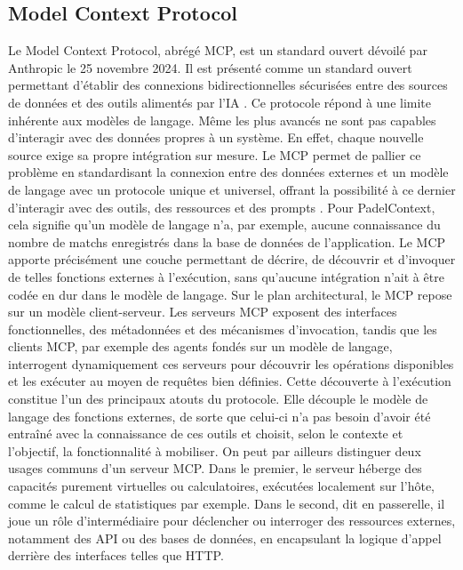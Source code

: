 \documentclass[12pt]{article}
\begin{document}
\subsection{Model Context Protocol}
Le Model Context Protocol, abrégé MCP, est un standard ouvert dévoilé par Anthropic le 25 novembre 2024. Il est présenté comme un standard ouvert permettant d'établir des connexions bidirectionnelles sécurisées entre des sources de données et des outils alimentés par l'IA \parencite{anthropic_introducing_2024}. 
\newline\newline
Ce protocole répond à une limite inhérente aux modèles de langage. Même les plus avancés ne sont pas capables d'interagir avec des données propres à un système. En effet, chaque nouvelle source exige sa propre intégration sur mesure. Le MCP permet de pallier ce problème en standardisant la connexion entre des données externes et un modèle de langage avec un protocole unique et universel, offrant la possibilité à ce dernier d'interagir avec des outils, des ressources et des prompts \parencite{vieira_da_silva_beyond_2025}.
\newline\newline
Pour PadelContext, cela signifie qu'un modèle de langage n'a, par exemple, aucune connaissance du nombre de matchs enregistrés dans la base de données de l'application. Le MCP apporte précisément une couche permettant de décrire, de découvrir et d'invoquer de telles fonctions externes à l'exécution, sans qu'aucune intégration n'ait à être codée en dur dans le modèle de langage.
\newline\newline
Sur le plan architectural, le MCP repose sur un modèle client-serveur. Les serveurs MCP exposent des interfaces fonctionnelles, des métadonnées et des mécanismes d'invocation, tandis que les clients MCP, par exemple des agents fondés sur un modèle de langage, interrogent dynamiquement ces serveurs pour découvrir les opérations disponibles et les exécuter au moyen de requêtes bien définies. Cette découverte à l'exécution constitue l'un des principaux atouts du protocole. Elle découple le modèle de langage des fonctions externes, de sorte que celui-ci n'a pas besoin d'avoir été entraîné avec la connaissance de ces outils et choisit, selon le contexte et l'objectif, la fonctionnalité à mobiliser.
\newline\newline
On peut par ailleurs distinguer deux usages communs d'un serveur MCP. Dans le premier, le serveur héberge des capacités purement virtuelles ou calculatoires, exécutées localement sur l'hôte, comme le calcul de statistiques par exemple. Dans le second, dit en passerelle, il joue un rôle d'intermédiaire pour déclencher ou interroger des ressources externes, notamment des API ou des bases de données, en encapsulant la logique d'appel derrière des interfaces telles que HTTP.
\end{document}
